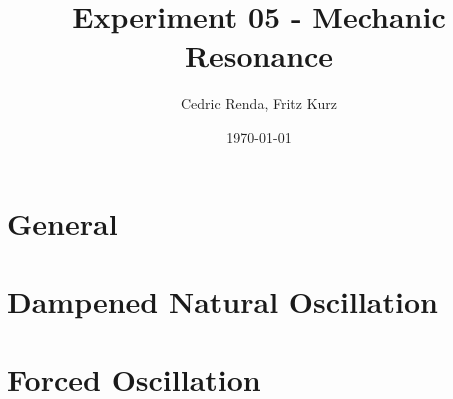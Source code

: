 \documentclass[12pt,a4paper]{article}
\title{Experiment 05 - Mechanic Resonance}
\author{Cedric Renda, Fritz Kurz}
\date{\today }
\begin{document}
\maketitle


\tableofcontents

\section{General}



\section{Dampened Natural Oscillation}
%


\newpage


\section{Forced Oscillation}
%






%
\newpage


\end{document}
